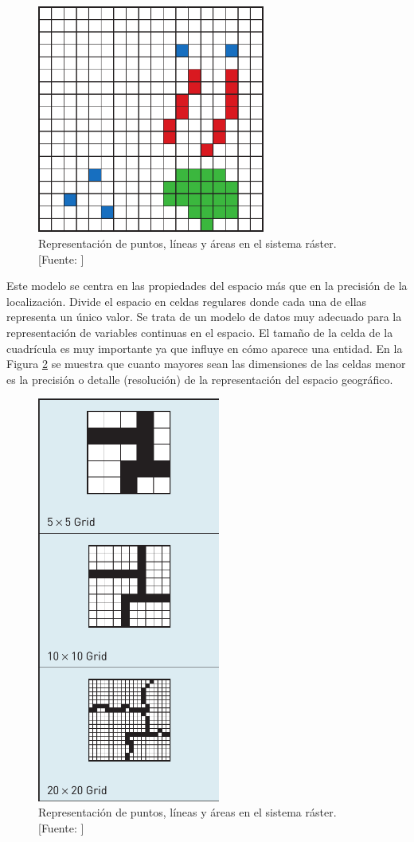 \begin{figure}[H]
    \centering
    \includegraphics[width=7.5cm]{modeloRaster.png}
    \caption{Representación de puntos, líneas y áreas en el sistema ráster. [Fuente: ]}
    \label{fig:modeloRaster}
\end{figure}

Este modelo se centra en las propiedades del espacio más que en la precisión de la localización. Divide el espacio en celdas regulares donde cada una de ellas representa un único valor. Se trata de un modelo de datos muy adecuado para la representación de variables continuas en el espacio. El tamaño de la celda de la cuadrícula es muy importante ya que influye en cómo aparece una entidad. En la Figura \ref{fig:rasterResolution} se muestra que cuanto mayores sean las dimensiones de las celdas menor es la precisión o detalle (resolución) de la representación del espacio geográfico.

\begin{figure}[H]
    \centering
    \includegraphics[width=6cm]{RasterResolution.png}
    \caption{Representación de puntos, líneas y áreas en el sistema ráster. [Fuente: ]}
    \label{fig:rasterResolution}
\end{figure}

